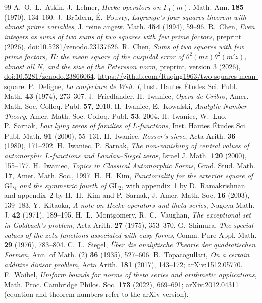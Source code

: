 \documentclass[11pt]{amsart}
\theoremstyle{remark}
\begin{document}
\begin{thebibliography}{99}
 A.~O.~L.~Atkin, J.~Lehner, \emph{Hecke operators on $\Gamma_0(m)$}, Math. Ann. \textbf{185} (1970), 134--160.
 J.~Br\"udern, \'E.~Fouvry, \emph{Lagrange's four squares theorem with almost prime variables}, J. reine angew. Math. \textbf{454} (1994), 59--96.
 R.~Chen, \emph{Even integers as sums of two sums of two squares with few prime factors}, preprint (2026), \href{https://doi.org/10.5281/zenodo.23137626}{doi:10.5281/zenodo.23137626}.
 R.~Chen, \emph{Sums of two squares with few prime factors, II: the mean square of the cuspidal error of $\theta^2(mz)\theta^2(m'z)$, almost all $N$, and the size of the Petersson norm}, preprint, version 3 (2026), \href{https://doi.org/10.5281/zenodo.23866064}{doi:10.5281/zenodo.23866064}, \url{https://github.com/Ruqing1963/two-squares-mean-square}.
 P.~Deligne, \emph{La conjecture de Weil. I}, Inst. Hautes \'Etudes Sci. Publ. Math. \textbf{43} (1974), 273--307.
 J.~Friedlander, H.~Iwaniec, \emph{Opera de Cribro}, Amer. Math. Soc. Colloq. Publ. \textbf{57}, 2010.
 H.~Iwaniec, E.~Kowalski, \emph{Analytic Number Theory}, Amer. Math. Soc. Colloq. Publ. \textbf{53}, 2004.
 H.~Iwaniec, W.~Luo, P.~Sarnak, \emph{Low lying zeros of families of $L$-functions}, Inst. Hautes \'Etudes Sci. Publ. Math. \textbf{91} (2000), 55--131.
 H.~Iwaniec, \emph{Rosser's sieve}, Acta Arith. \textbf{36} (1980), 171--202.
 H.~Iwaniec, P.~Sarnak, \emph{The non-vanishing of central values of automorphic $L$-functions and Landau--Siegel zeros}, Israel J. Math. \textbf{120} (2000), 155--177.
 H.~Iwaniec, \emph{Topics in Classical Automorphic Forms}, Grad. Stud. Math. \textbf{17}, Amer. Math. Soc., 1997.
 H.~H.~Kim, \emph{Functoriality for the exterior square of $\mathrm{GL}_4$ and the symmetric fourth of $\mathrm{GL}_2$}, with appendix~1 by D.~Ramakrishnan and appendix~2 by H.~H.~Kim and P.~Sarnak, J. Amer. Math. Soc. \textbf{16} (2003), 139--183.
 Y.~Kitaoka, \emph{A note on Hecke operators and theta-series}, Nagoya Math. J. \textbf{42} (1971), 189--195.
 H.~L.~Montgomery, R.~C.~Vaughan, \emph{The exceptional set in Goldbach's problem}, Acta Arith. \textbf{27} (1975), 353--370.
 G.~Shimura, \emph{The special values of the zeta functions associated with cusp forms}, Comm. Pure Appl. Math. \textbf{29} (1976), 783--804.
 C.~L.~Siegel, \emph{\"Uber die analytische Theorie der quadratischen Formen}, Ann. of Math. (2) \textbf{36} (1935), 527--606.
 B.~Topacogullari, \emph{On a certain additive divisor problem}, Acta Arith. \textbf{181} (2017), 143--172; \href{https://arxiv.org/abs/1512.05770}{arXiv:1512.05770}.
 F.~Waibel, \emph{Uniform bounds for norms of theta series and arithmetic applications}, Math. Proc. Cambridge Philos. Soc. \textbf{173} (2022), 669--691; \href{https://arxiv.org/abs/2012.04311}{arXiv:2012.04311} (equation and theorem numbers refer to the arXiv version).
\end{thebibliography}
\end{document}
